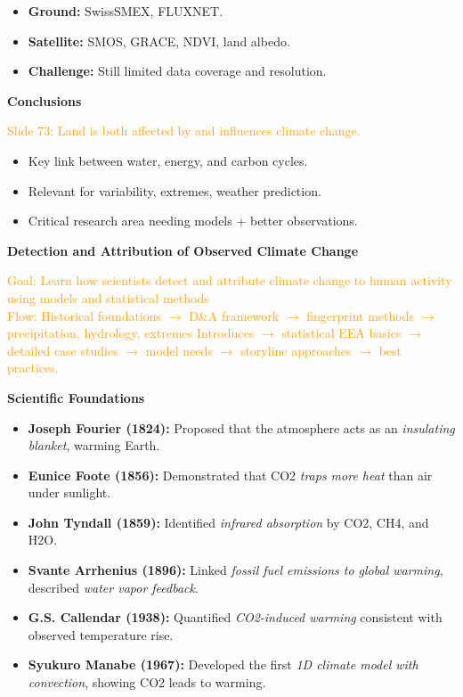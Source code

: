 \documentclass[fontsize=8pt, a4paper, landscape, fleqn]{scrartcl}
\renewcommand{\section}[1]{%
    \noindent\colorbox{sectioncolor}{%
        \parbox{\dimexpr\columnwidth-2\fboxsep}{\color{white}\textbf{#1}}}%
    \vspace{0.5mm}%
}
\renewcommand{\subsection}[1]{%
    \noindent\colorbox{subsectioncolor}{%
        \parbox{\dimexpr\columnwidth-2\fboxsep}{\color{white}\textbf{#1}}}%
    \vspace{0.5mm}%
}
\begin{document}
\begin{multicols*}{3}[\raggedcolumns]
\begin{itemize}
    \item \textbf{Ground:} SwissSMEX, FLUXNET.
    \item \textbf{Satellite:} SMOS, GRACE, NDVI, land albedo.
    \item \textbf{Challenge:} Still limited data coverage and resolution.
\end{itemize}

\subsection{Conclusions}
\noindent \textcolor{orange}{Slide 73: Land is both affected by and influences climate change.}

\begin{itemize}
    \item Key link between water, energy, and carbon cycles.
    \item Relevant for variability, extremes, weather prediction.
    \item Critical research area needing models + better observations.
\end{itemize}

\section{Detection and Attribution of Observed Climate Change}
\noindent\textcolor{orange}{
Goal: Learn how scientists detect and attribute climate change to human activity using models and statistical methods\\
Flow: Historical foundations $\rightarrow$ D\&A framework $\rightarrow$ fingerprint methods $\rightarrow$ precipitation, hydrology, extremes Introduces $\rightarrow$ statistical EEA basics $\rightarrow$ detailed case studies $\rightarrow$ model needs $\rightarrow$ storyline approaches $\rightarrow$ best practices.
}
\subsection{Scientific Foundations}
\begin{itemize}
    \item \textbf{Joseph Fourier (1824):} Proposed that the atmosphere acts as an \textit{insulating blanket}, warming Earth.
    \item \textbf{Eunice Foote (1856):} Demonstrated that CO2 \textit{traps more heat} than air under sunlight.
    \item \textbf{John Tyndall (1859):} Identified \textit{infrared absorption} by CO2, CH4, and H2O.
    \item \textbf{Svante Arrhenius (1896):} Linked \textit{fossil fuel emissions to global warming}, described \textit{water vapor feedback}.
    \item \textbf{G.S. Callendar (1938):} Quantified \textit{CO2-induced warming} consistent with observed temperature rise.
    \item \textbf{Syukuro Manabe (1967):} Developed the first \textit{1D climate model with convection}, showing CO2 leads to warming.
\end{itemize}


\end{multicols*}
\end{document}
